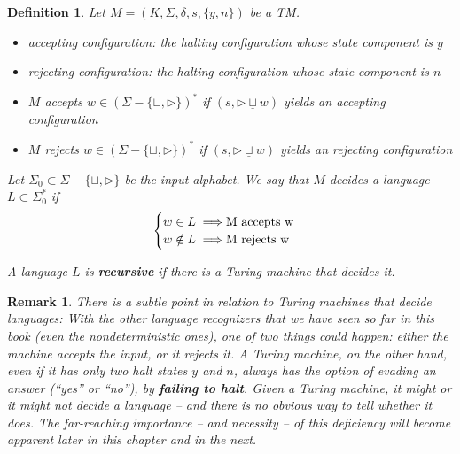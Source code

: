 \documentclass[aps,pra,onecolumn,notitlepage,superscriptaddress]{revtex4-1}
\def\u{\underline}
\newtheorem{defi}{Definition}
\newtheorem{rem}{Remark}
\begin{document}
    \begin{defi}
        Let $M = (K, \Sigma, \delta, s, \{y,n\})$ be a TM.
        \begin{itemize}
            \item accepting configuration: the halting configuration whose state component is $y$ 
            \item rejecting configuration: the halting configuration whose state component is $n$ 
            \item $M$ accepts $w \in (\Sigma-\{ \sqcup,\rhd \})^*$ if $(s, \rhd \u \sqcup w)$ yields an accepting configuration
            \item $M$ rejects $w \in (\Sigma-\{ \sqcup,\rhd \})^*$ if $(s, \rhd \u \sqcup w)$ yields an rejecting configuration
        \end{itemize}

        Let $\Sigma_0 \subset \Sigma - \{ \sqcup, \rhd \}$ be the input alphabet. We say that $M$ decides a language $L \subset \Sigma_0^*$ if
        \begin{equation*}
            \begin{cases}
                w \in L \implies $M$ \text{ accepts } $w$ \\
                w \notin L \implies $M$ \text{ rejects } $w$
            \end{cases}
        \end{equation*}

        A language $L$ is \textbf{recursive} if there is a Turing machine that decides it.
    \end{defi}

    \begin{rem}
        There is a subtle point in relation to Turing machines that decide languages: With the other language recognizers that we have seen so far in this book (even the nondeterministic ones), one of two things could happen: either the machine accepts the input, or it rejects it. A Turing machine, on the other hand, even if it has only two halt states $y$ and $n$, always has the option of evading an answer (``yes'' or ``no''), by \textbf{failing to halt}. Given a Turing machine, it might or it might not decide a language -- and there is no obvious way to tell whether it does. The far-reaching importance -- and necessity -- of this deficiency will become apparent later in this chapter and in the next.
    \end{rem}
\end{document}
